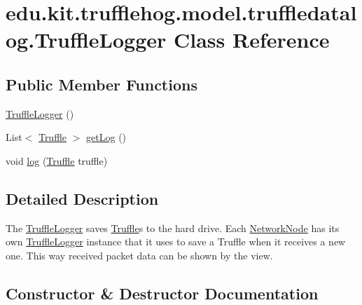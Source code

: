\hypertarget{classedu_1_1kit_1_1trufflehog_1_1model_1_1truffledatalog_1_1_truffle_logger}{}\section{edu.\+kit.\+trufflehog.\+model.\+truffledatalog.\+Truffle\+Logger Class Reference}
\label{classedu_1_1kit_1_1trufflehog_1_1model_1_1truffledatalog_1_1_truffle_logger}
\subsection*{Public Member Functions}
\begin{DoxyCompactItemize}
\item 
\hyperlink{classedu_1_1kit_1_1trufflehog_1_1model_1_1truffledatalog_1_1_truffle_logger_aa8755337ce55e0965b595340e640d717}{Truffle\+Logger} ()
\item 
List$<$ \hyperlink{classedu_1_1kit_1_1trufflehog_1_1service_1_1packetdataprocessor_1_1profinetdataprocessor_1_1_truffle}{Truffle} $>$ \hyperlink{classedu_1_1kit_1_1trufflehog_1_1model_1_1truffledatalog_1_1_truffle_logger_a7c81addbba55664ce140a0bf50a3c64a}{get\+Log} ()
\item 
void \hyperlink{classedu_1_1kit_1_1trufflehog_1_1model_1_1truffledatalog_1_1_truffle_logger_a112e0401ffaab201b6e254e40b96617d}{log} (\hyperlink{classedu_1_1kit_1_1trufflehog_1_1service_1_1packetdataprocessor_1_1profinetdataprocessor_1_1_truffle}{Truffle} truffle)
\end{DoxyCompactItemize}


\subsection{Detailed Description}
The \hyperlink{classedu_1_1kit_1_1trufflehog_1_1model_1_1truffledatalog_1_1_truffle_logger}{Truffle\+Logger} saves \hyperlink{}{Truffle}s to the hard drive. Each \hyperlink{}{Network\+Node} has its own \hyperlink{classedu_1_1kit_1_1trufflehog_1_1model_1_1truffledatalog_1_1_truffle_logger}{Truffle\+Logger} instance that it uses to save a Truffle when it receives a new one. This way received packet data can be shown by the view. 

\subsection{Constructor \& Destructor Documentation}
\hypertarget{classedu_1_1kit_1_1trufflehog_1_1model_1_1truffledatalog_1_1_truffle_logger_aa8755337ce55e0965b595340e640d717}{}
